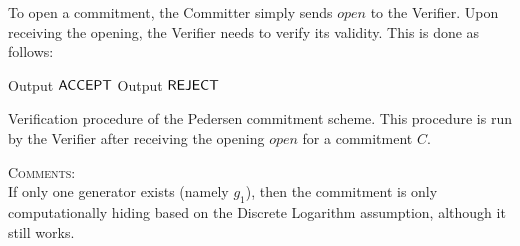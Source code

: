 To open a commitment, the Committer simply sends $open$ to the Verifier. Upon receiving the opening, the Verifier needs to verify its validity. This is done as follows:


\begin{algorithm}[H]\label{verifyP}
\dontprintsemicolon

\BlankLine

 \;
\Indp
    {Output $\mathsf{ACCEPT}$ \;}
  \Else
    {Output $\mathsf{REJECT}$ \;}
\Indm

\caption{Verification procedure of the Pedersen commitment scheme. This procedure is run by the Verifier after receiving the opening $open$ for a commitment $C$.}
\end{algorithm}



\textsc{Comments}:\\
If only one generator exists (namely $g_1$), then the commitment is only computationally hiding based on the Discrete Logarithm assumption, although it still works.
